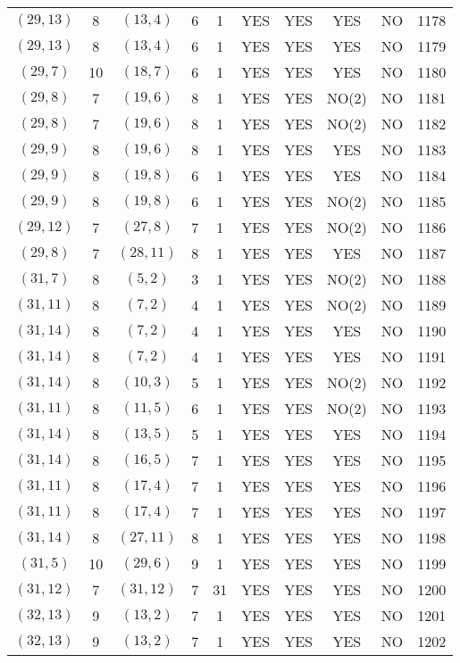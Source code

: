 \begin{longtable}{|c|c|c|c|c|c|c|c|c|c|}
$(29, 13)$ & 8 & $(13, 4)$ & 6 & 1 & YES & YES & YES & NO & 1178\\
$(29, 13)$ & 8 & $(13, 4)$ & 6 & 1 & YES & YES & YES & NO & 1179\\
$(29, 7)$ & 10 & $(18, 7)$ & 6 & 1 & YES & YES & YES & NO & 1180\\
$(29, 8)$ & 7 & $(19, 6)$ & 8 & 1 & YES & YES & NO(2) & NO & 1181\\
$(29, 8)$ & 7 & $(19, 6)$ & 8 & 1 & YES & YES & NO(2) & NO & 1182\\
$(29, 9)$ & 8 & $(19, 6)$ & 8 & 1 & YES & YES & YES & NO & 1183\\
$(29, 9)$ & 8 & $(19, 8)$ & 6 & 1 & YES & YES & YES & NO & 1184\\
$(29, 9)$ & 8 & $(19, 8)$ & 6 & 1 & YES & YES & NO(2) & NO & 1185\\
$(29, 12)$ & 7 & $(27, 8)$ & 7 & 1 & YES & YES & NO(2) & NO & 1186\\
$(29, 8)$ & 7 & $(28, 11)$ & 8 & 1 & YES & YES & YES & NO & 1187\\
$(31, 7)$ & 8 & $(5, 2)$ & 3 & 1 & YES & YES & NO(2) & NO & 1188\\
$(31, 11)$ & 8 & $(7, 2)$ & 4 & 1 & YES & YES & NO(2) & NO & 1189\\
$(31, 14)$ & 8 & $(7, 2)$ & 4 & 1 & YES & YES & YES & NO & 1190\\
$(31, 14)$ & 8 & $(7, 2)$ & 4 & 1 & YES & YES & YES & NO & 1191\\
$(31, 14)$ & 8 & $(10, 3)$ & 5 & 1 & YES & YES & NO(2) & NO & 1192\\
$(31, 11)$ & 8 & $(11, 5)$ & 6 & 1 & YES & YES & NO(2) & NO & 1193\\
$(31, 14)$ & 8 & $(13, 5)$ & 5 & 1 & YES & YES & YES & NO & 1194\\
$(31, 14)$ & 8 & $(16, 5)$ & 7 & 1 & YES & YES & YES & NO & 1195\\
$(31, 11)$ & 8 & $(17, 4)$ & 7 & 1 & YES & YES & YES & NO & 1196\\
$(31, 11)$ & 8 & $(17, 4)$ & 7 & 1 & YES & YES & YES & NO & 1197\\
$(31, 14)$ & 8 & $(27, 11)$ & 8 & 1 & YES & YES & YES & NO & 1198\\
$(31, 5)$ & 10 & $(29, 6)$ & 9 & 1 & YES & YES & YES & NO & 1199\\
$(31, 12)$ & 7 & $(31, 12)$ & 7 & 31 & YES & YES & YES & NO & 1200\\
$(32, 13)$ & 9 & $(13, 2)$ & 7 & 1 & YES & YES & YES & NO & 1201\\
$(32, 13)$ & 9 & $(13, 2)$ & 7 & 1 & YES & YES & YES & NO & 1202\\

\end{longtable}
